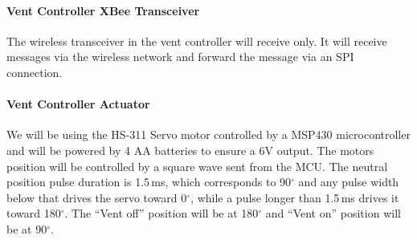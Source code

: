 \paragraph{Vent Controller XBee Transceiver}
The wireless transceiver in the vent controller will receive only. It will receive messages via the wireless network and forward the message via an SPI connection.
\paragraph{Vent Controller Actuator}
We will be using the HS-311 Servo motor controlled by a MSP430 microcontroller and will be powered by 4 AA batteries to ensure a 6V output. The motors position will be controlled by a square wave sent from the MCU. The neutral position pulse duration is 1.5\,ms, which corresponds to 90$^{\circ}$ and any pulse width below that drives the servo toward 0$^{\circ}$, while a pulse longer than 1.5\,ms drives it toward 180$^{\circ}$. The ``Vent off'' position will be at 180$^{\circ}$ and ``Vent on'' position will be at 90$^{\circ}$.
